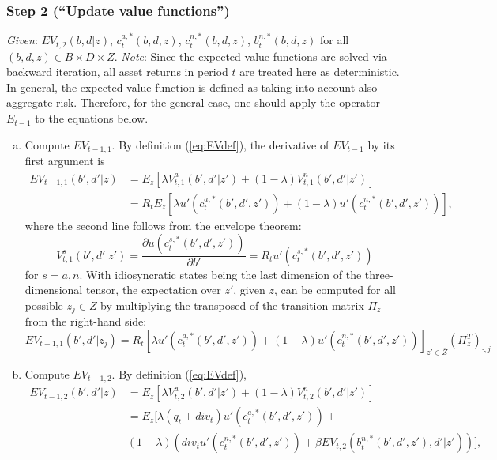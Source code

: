 \documentclass[11pt]{article} %
\begin{document}
\subsubsection{Step 2 (``Update value functions'')} \label{sec:step2}
\textit{Given}: $EV_{t,2}(b,d|z)$, $c_t^{a,*}(b,d,z)$, $c_t^{n,*}(b,d,z)$, $b_t^{n,*}(b,d,z)$ for all $(b,d,z)\in \overline{B}\times\overline{D}\times\overline{Z}$.
\textit{Note}: Since the expected value functions are solved via backward iteration, all asset returns in period $t$ are treated here as deterministic. In general, the expected value function is defined as taking into account also aggregate risk. Therefore, for the general case, one should apply the operator $E_{t-1}$ to the equations below.
\begin{enumerate}[a.)]
\item Compute $EV_{t-1,1}$. By definition (\ref{eq:EVdef}), the derivative of $EV_{t-1}$ by its first argument is
\begin{align}
EV_{t-1,1}(b',d'|z) &= E_{z}\left[ \lambda V^a_{t,1}(b',d'|z') + (1-\lambda) V^n_{t,1}(b',d'|z') \right]\\
& = R_t E_{z}\left[ \lambda u'(c_t^{a,*}(b',d',z')) + (1-\lambda) u'(c_t^{n,*}(b',d',z')) \right],\label{eq:VbMU}
\end{align}
where the second line follows from the envelope theorem:
\begin{equation}
V^{s}_{t,1}(b',d'|z') = \frac{\partial u(c_t^{s,*}(b',d',z'))}{\partial b'} = R_t u'(c_t^{s,*}(b',d',z'))
\end{equation}
for $s=a,n$.
 With idiosyncratic states being the last dimension of the three-dimensional tensor, the expectation over $z'$, given $z$, can be computed for all possible $z_j\in \overline{Z}$ by multiplying the transposed of the transition matrix $\Pi_z$ from the right-hand side:
\begin{equation}
EV_{t-1,1}(b',d'|z_j) = R_t \left[ \lambda u'(c_t^{a,*}(b',d',z')) + (1-\lambda) u'(c_t^{n,*}(b',d',z')) \right]_{z'\in\overline{Z}} \left(\Pi_z^T\right)_{\cdot,j}
\end{equation}
\item Compute $EV_{t-1,2}$.  By definition (\ref{eq:EVdef}),
\begin{align}
EV_{t-1,2}(b',d'|z) &= E_{z}\left[ \lambda V^a_{t,2}(b',d'|z') + (1-\lambda) V^n_{t,2}(b',d'|z') \right]\\
& = E_{z}[ \lambda (q_t+div_t) u'(c_t^{a,*}(b',d',z')) + \label{eq:EVdFull}  \\ & (1-\lambda) ( div_t u'(c_t^{n,*}(b',d',z')) + \beta EV_{t,2}(b_t^{n,*}(b',d',z'),d'|z' )) ] \nonumber,

\end{align}
\end{enumerate}
\end{document}
